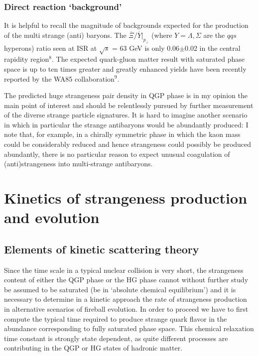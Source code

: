 \begin{mdframed}[linecolor=gray,roundcorner=12pt,backgroundcolor=Dandelion!15,linewidth=1pt,leftmargin=0cm,rightmargin=0cm,topline=true,bottomline=true,skipabove=12pt]
\subsubsection*{Direct reaction \lq background\rq} 
It is helpful to recall the magnitude of backgrounds expected for the
production of the multi strange (anti) baryons. The $\overline{\Xi}/
\overline{Y}|_{p_\bot}$ (where $Y=\Lambda,\Sigma$ are the $qqs$ hyperons) ratio seen at ISR at $\sqrt{s}$ = 63 GeV is only 0.06$\pm$0.02 in the central rapidity region$^{8}$. The expected quark-gluon matter result with saturated phase space is up to ten times greater and greatly
enhanced yields have been recently reported by the WA85
collaboration$^9$.
 
The predicted huge strangeness pair density in QGP phase is in my opinion the main point of interest and should be relentlessly pursued by further measurement of the diverse strange particle signatures. It is hard to imagine another scenario in which in particular the strange antibaryons would be abundantly produced: I note that, for example, in a chirally symmetric phase in which the kaon mass could be considerably reduced and hence strangeness could possibly be produced abundantly, there is no  particular reason to expect unusual coagulation of (anti)strangeness into multi-strange antibaryons.


\section*{Kinetics of strangeness production and evolution} 
\subsection*{Elements of kinetic scattering theory}
Since the time scale in a typical nuclear collision is very short, the
strangeness content of either the QGP phase or the HG phase cannot
without further study be assumed to be saturated (be in `absolute
chemical equilibrium') and it is necessary to determine in a kinetic
approach the rate of strangeness production in alternative scenarios of
fireball evolution. In order to proceed we have to first compute the
typical time required to produce strange quark flavor in the abundance
corresponding to fully saturated phase space. This chemical relaxation
time constant is strongly state dependent, as quite different processes
are contributing in the QGP or HG states of hadronic matter.
 

\end{mdframed}
